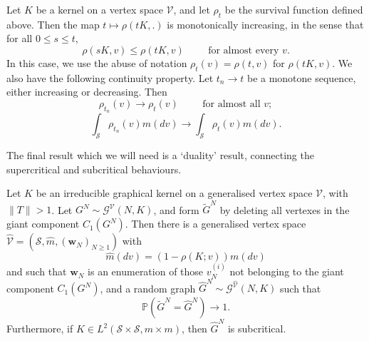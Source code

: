    \begin{theorem}\label{thrm: continuity of rho} Let $K$ be a kernel on a vertex space $\mathcal{V}$, and let $\rho_t$ be the survival function defined above. Then the map $t\mapsto \rho(tK, .)$ is monotonically increasing, in the sense that for all $0\leq s \leq t$, \begin{equation}
          \rho(sK, v) \leq \rho(tK, v) \hspace{1cm} \text{for almost every } v.
      \end{equation}In this case, we use the abuse of notation $\rho_t(v)=\rho(t,v)$ for $\rho(tK,v).$ We also have the following continuity property. Let $t_n\rightarrow t$ be a monotone sequence, either increasing or decreasing. Then \begin{equation}
       \rho_{t_n}(v)\rightarrow \rho_t(v) \hspace{1cm} \text{for almost all }v;
   \end{equation} \begin{equation}
       \int_{\mathcal{S}}\rho_{t_n}(v)m(dv)\rightarrow \int_{\mathcal{S}}\rho_t(v)m(dv).
   \end{equation} \end{theorem} The final result which we will need is a `duality' result, connecting the supercritical and subcritical behaviours.
   \begin{theorem}\label{thrm: coupling supercritical and subcritical} Let $K$ be an irreducible graphical kernel on a generalised vertex space $\mathcal{V}$, with $\|T\|>1$. Let $G^N \sim \mathcal{G}^\mathcal{V}(N, K)$, and form $\widetilde{G}^N$ by deleting all vertexes in the giant component $C_1(G^N).$ Then there is a generalised vertex space $\widehat{\mathcal{V}}=(\mathcal{S}, \widehat{m}, (\mathbf{w}_N)_{N\geq 1})$ with \begin{equation}
       \widehat{m}(dv)=(1-\rho(K;v))m(dv)
   \end{equation} and such that $\mathbf{w}_N$ is an enumeration of those $v^{(i)}_N$ not belonging to the giant component $C_1(G^N)$, and a random graph $\widehat{G}^N \sim \mathcal{G}^{\widehat{\mathcal{V}}}(N,K)$ such that \begin{equation}
       \mathbb{P}(\widetilde{G}^N=\widehat{G}^N)\rightarrow 1.
   \end{equation}  Furthermore, if $K\in L^2(\mathcal{S}\times \mathcal{S}, m\times m)$, then $\widehat{G}^N$ is subcritical.\end{theorem} 